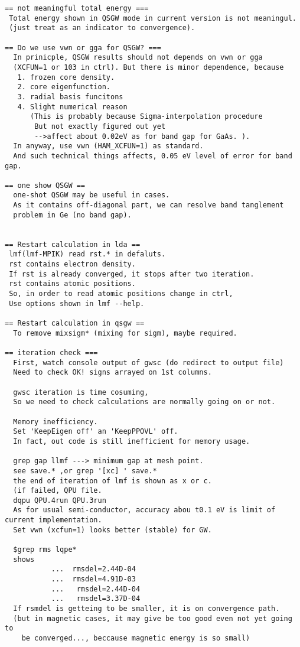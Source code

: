 \documentclass[a4paper,10pt,epsf,fleqn]{article}
\begin{document}
\begin{verbatim}
== not meaningful total energy ===
 Total energy shown in QSGW mode in current version is not meaningul.
 (just treat as an indicator to convergence).

== Do we use vwn or gga for QSGW? ===
  In prinicple, QSGW results should not depends on vwn or gga 
  (XCFUN=1 or 103 in ctrl). But there is minor dependence, because
   1. frozen core density.
   2. core eigenfunction.
   3. radial basis funcitons
   4. Slight numerical reason 
      (This is probably because Sigma-interpolation procedure
       But not exactly figured out yet
       -->affect about 0.02eV as for band gap for GaAs. ).
  In anyway, use vwn (HAM_XCFUN=1) as standard.
  And such technical things affects, 0.05 eV level of error for band gap.

== one show QSGW ==
  one-shot QSGW may be useful in cases.
  As it contains off-diagonal part, we can resolve band tanglement
  problem in Ge (no band gap).
 

== Restart calculation in lda ==
 lmf(lmf-MPIK) read rst.* in defaluts.
 rst contains electron density.
 If rst is already converged, it stops after two iteration.
 rst contains atomic positions.
 So, in order to read atomic positions change in ctrl,
 Use options shown in lmf --help.

== Restart calculation in qsgw ==
  To remove mixsigm* (mixing for sigm), maybe required.

== iteration check ===
  First, watch console output of gwsc (do redirect to output file)
  Need to check OK! signs arrayed on 1st columns.

  gwsc iteration is time cosuming,
  So we need to check calculations are normally going on or not.

  Memory inefficiency.
  Set 'KeepEigen off' an 'KeepPPOVL' off.
  In fact, out code is still inefficient for memory usage.
  
  grep gap llmf ---> minimum gap at mesh point.
  see save.* ,or grep '[xc] ' save.*
  the end of iteration of lmf is shown as x or c.
  (if failed, QPU file. 
  dqpu QPU.4run QPU.3run
  As for usual semi-conductor, accuracy abou t0.1 eV is limit of current implementation.
  Set vwn (xcfun=1) looks better (stable) for GW.

  $grep rms lqpe* 
  shows
           ...  rmsdel=2.44D-04
           ...  rmsdel=4.91D-03
           ...   rmsdel=2.44D-04
           ...   rmsdel=3.37D-04
  If rsmdel is getteing to be smaller, it is on convergence path.
  (but in magnetic cases, it may give be too good even not yet going to
	be converged..., beccause magnetic energy is so small)


\end{verbatim}
\end{document}
